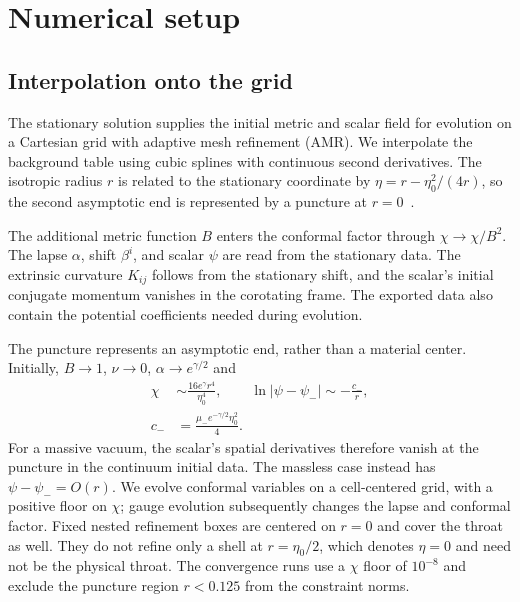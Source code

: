 \documentclass[twocolumn,floatfix,aps,prd,superscriptaddress,nofootinbib]{revtex4-2}
\begin{document}
\section{Numerical setup}
\label{sec:setup}

\subsection{Interpolation onto the grid}
\label{sec:setup:id}

The stationary solution supplies the initial metric and scalar field for evolution on a Cartesian grid with adaptive mesh refinement (AMR). We interpolate the background table using cubic splines with continuous second derivatives. The isotropic radius $r$ is related to the stationary coordinate by $\eta=r-\eta_0^2/(4r)$, so the second asymptotic end is represented by a puncture at $r=0$~\cite{shirokov2026s}.

The additional metric function $B$ enters the conformal factor through $\chi\to\chi/B^2$. The lapse $\alpha$, shift $\beta^i$, and scalar $\psi$ are read from the stationary data. The extrinsic curvature $K_{ij}$ follows from the stationary shift, and the scalar's initial conjugate momentum vanishes in the corotating frame. The exported data also contain the potential coefficients needed during evolution.

The puncture represents an asymptotic end, rather than a material center.
Initially, $B\to1$, $\nu\to0$, $\alpha\to e^{\gamma/2}$ and
\begin{equation}
\begin{aligned}
\chi&\sim \frac{16e^\gamma r^4}{\eta_0^4},\qquad
\ln|\psi-\psi_-|\sim-\frac{c_-}{r},\\
c_-&=\frac{\mu_-e^{-\gamma/2}\eta_0^2}{4}.
\end{aligned}
\label{eq:puncture}
\end{equation}
For a massive vacuum, the scalar's spatial derivatives therefore vanish
at the puncture in the continuum initial data. The massless case instead
has $\psi-\psi_-=O(r)$. We evolve conformal variables on a cell-centered
grid, with a positive floor on $\chi$; gauge evolution subsequently changes
the lapse and conformal factor. Fixed nested refinement boxes are centered
on $r=0$ and cover the throat as well. They do not refine only a shell at
$r=\eta_0/2$, which denotes $\eta=0$ and need not be the physical throat.
The convergence runs use a $\chi$ floor of $10^{-8}$ and exclude the
puncture region $r<0.125$ from the constraint norms.
\end{document}
